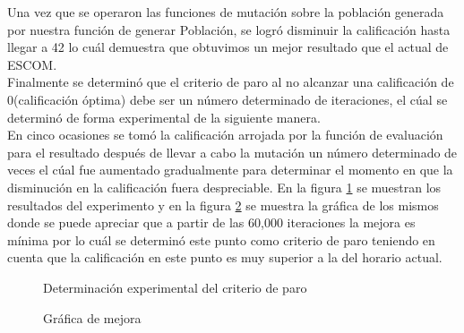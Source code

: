 Una vez que se operaron las funciones de mutación sobre la población generada por nuestra función de generar Población, se logró disminuir la calificación hasta llegar a 42 lo cuál demuestra que obtuvimos un mejor resultado que el actual de ESCOM.\\

Finalmente se determinó que el criterio de paro al no alcanzar una calificación de 0(calificación óptima) debe ser un número determinado de iteraciones, el cúal se determinó de forma experimental de la siguiente manera.\\

En cinco ocasiones se tomó la calificación arrojada por la función de evaluación para el resultado después de llevar a cabo la mutación un número determinado de veces el cúal fue aumentado gradualmente para determinar el momento en que la disminución en la calificación fuera despreciable. En la figura \ref{fig:PruebaV1} se muestran los resultados del experimento y en la figura \ref{fig:grafV1} se muestra la gráfica de los mismos donde se puede apreciar que a partir de las 60,000 iteraciones la mejora es mínima por lo cuál se determinó este punto como criterio de paro teniendo en cuenta que la calificación en este punto es muy superior a la del horario actual.\\
 
 \begin{figure}[htbp!]
 	\begin{center}
 		\caption{Determinación experimental del criterio de paro}
 		\label{fig:PruebaV1}
 	\end{center}
 \end{figure}


\begin{figure}[htbp!]
	\begin{center}
		\caption{Gráfica de mejora}
		\label{fig:grafV1}
	\end{center}
\end{figure}

